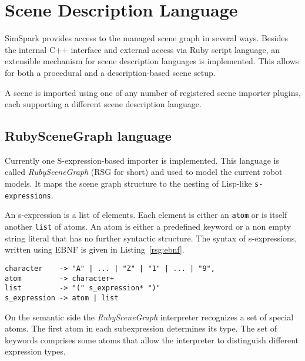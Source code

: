 \chapter{Scene Description Language}

SimSpark provides access to the managed scene graph in several ways.
Besides the internal C++ interface and external access via Ruby script
language, an extensible mechanism for scene description languages is
implemented. This allows for both a procedural and a description-based
scene setup.

A scene is imported using one of any number of registered scene
importer plugins, each supporting a different scene description
language.

\section{RubySceneGraph language}

Currently one S-expression-based importer is implemented. This
language is called \emph{RubySceneGraph} (RSG for short) and used to
model the current robot models. It maps the scene graph structure to
the nesting of Lisp-like \texttt{s-expressions}.

An s-expression is a list of elements. Each element is either an
\texttt{atom} or is itself another \texttt{list} of atoms. An atom is
either a predefined keyword or a non empty string literal that has no
further syntactic structure. The syntax of s-expressions, written
using EBNF is given in Listing~\ref{rsg:ebnf}.

\lstset{captionpos=b,frame=none,%
  basicstyle=\small,breaklines=true}

\begin{lstlisting}[caption={EBNF notation of s-expressions}, label=rsg:ebnf]
character    -> "A" | ... | "Z" | "1" | ... | "9",
atom         -> character+
list         -> "(" s_expression* ")"
s_expression -> atom | list
\end{lstlisting}

\lstset{language=lisp,language=lisp,captionpos=b,frame=none,%
  basicstyle=\small,commentstyle=\bf,breaklines=true}

On the semantic side the \emph{RubySceneGraph} interpreter recognizes
a set of special atoms. The first atom in each subexpression
determines its type. The set of keywords comprises some atoms that
allow the interpreter to distinguish different expression types.


